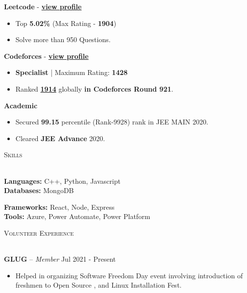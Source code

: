 \documentclass[10pt]{article}
\newcommand{\tinyBulletSep} { \vspace{1.2mm} }
\newcommand{\bulletSep} { \vspace{2.2mm} }
\newcommand{\sectionSep} { \vspace{3mm} }
\newcommand{\lineunder} {
    \vspace*{-8pt} \\
    \hspace*{-15pt} \hrulefill \\
}
\newcommand{\header} [1] {
    {\hspace*{-18pt}\vspace*{6pt} {
        \fontfamily{qcs}\selectfont \large \scshape #1
    }}
    \vspace*{-6pt} \lineunder
    \vspace{0.5mm}
}
\newcommand{\volunteerItem}[5]{
    \textbf{#1} -- \textit{#2} \hfill #3 \\
    \begin{itemize}
        #4
    \end{itemize}
}
\begin{document}
 \textbf{Leetcode} - \textbf{\href{https://leetcode.com/Aditya_02/}{view profile}}
\begin{itemize}
    \item Top \textbf{5.02\%} (Max Rating - \textbf{1904})
    \item Solve more than 950 Questions.
\end{itemize}
\tinyBulletSep

\textbf{Codeforces} - \textbf{\href{https://codeforces.com/profile/Valier?mobile=false}{view profile}}
\begin{itemize}
    \item \textbf{Specialist
} | Maximum Rating: \textbf{1428}
    \item Ranked \textbf{\href{https://codeforces.com/contest/1925}{1914}} globally  \textbf{in Codeforces Round 921}.
\end{itemize}
\tinyBulletSep

 \textbf{Academic} 
\begin{itemize}
    \item Secured \textbf{99.15} percentile (Rank-9928) rank in JEE MAIN 2020.
    \item Cleared \textbf{JEE Advance} 2020.
\end{itemize}

\tinyBulletSep
\sectionSep


\header{Skills}
\begin{minipage}[t]{0.6\textwidth}
    \textbf{Languages:} C++, Python, Javascript\\
    \textbf{Databases:} MongoDB\\
\end{minipage}
\hfill
\begin{minipage}[t]{0.33\textwidth}
    \textbf{Frameworks:} React, Node, Express\\
    \textbf{Tools:} Azure, Power Automate, Power Platform
\end{minipage}
\sectionSep



\header{Volunteer Experience}

\volunteerItem{GLUG}{Member}{Jul 2021 - Present}{
    \item Helped in organizing Software Freedom Day event involving introduction of freshmen to Open Source , and Linux Installation Fest.
}

\bulletSep
\end{document}
